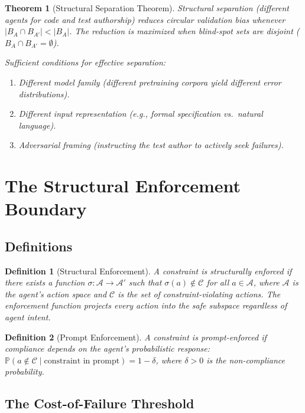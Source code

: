 \documentclass[11pt, a4paper, copyright]{googledeepmind}
\newtheorem{definition}{Definition}[section]
\newtheorem{theorem}{Theorem}[section]
\newcommand{\Prob}{\mathbb{P}}
\newcommand{\calA}{\mathcal{A}}
\newcommand{\calC}{\mathcal{C}}
\begin{document}
\begin{theorem}[Structural Separation Theorem]
\label{thm:separation}
Structural separation (different agents for code and test authorship) reduces circular validation bias whenever $|B_A \cap B_{A'}| < |B_A|$.
The reduction is maximized when blind-spot sets are disjoint ($B_A \cap B_{A'} = \emptyset$).

\noindent Sufficient conditions for effective separation:
\begin{enumerate}
\item Different model family (different pretraining corpora yield different error distributions).
\item Different input representation (e.g., formal specification vs.\ natural language).
\item Adversarial framing (instructing the test author to actively seek failures).
\end{enumerate}
\end{theorem}

\section{The Structural Enforcement Boundary}
\label{sec:structural}

\subsection{Definitions}

\begin{definition}[Structural Enforcement]
A constraint is \emph{structurally enforced} if there exists a function $\sigma: \calA \to \calA'$ such that $\sigma(a) \notin \calC$ for all $a \in \calA$, where $\calA$ is the agent's action space and $\calC$ is the set of constraint-violating actions.
The enforcement function projects every action into the safe subspace regardless of agent intent.
\end{definition}

\begin{definition}[Prompt Enforcement]
A constraint is \emph{prompt-enforced} if compliance depends on the agent's probabilistic response:
$\Prob(a \notin \calC \mid \text{constraint in prompt}) = 1 - \delta$,
where $\delta > 0$ is the non-compliance probability.
\end{definition}

\subsection{The Cost-of-Failure Threshold}
\end{document}
